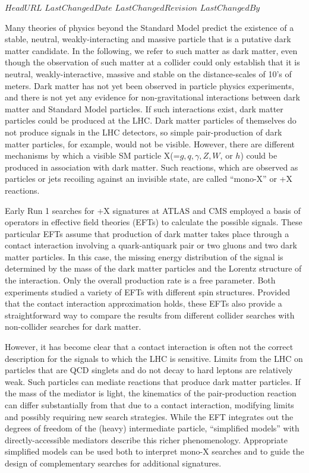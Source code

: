 \svnidlong
{$HeadURL$}
{$LastChangedDate$}
{$LastChangedRevision$}
{$LastChangedBy$}
\pagestyle{fancy}
\fancyhead{}
\fancyhead[ol]{\svnrev;\svndate;\svnauthor}

Many theories of physics beyond the Standard Model predict the existence
of a stable, neutral, weakly-interacting and massive particle that is
a putative dark matter candidate.   In the following, we refer to such
matter as dark matter, even though the observation of such matter at a collider
could only establish that it is neutral, weakly-interactive, massive and stable
on the distance-scales of 10's of meters.
Dark matter has not yet been observed in particle physics experiments, and
there is not yet any evidence for non-gravitational interactions
between dark matter and Standard Model particles.  If such
interactions exist, dark matter particles could be produced
at the LHC. Dark matter particles of themselves do not produce signals
in the LHC
detectors, so simple pair-production of dark matter particles, for example,
would
not be visible.
However, there are different mechanisms by which a
visible SM particle X(=$g, q, \gamma, Z, W$, or $h$)
could be produced in association with dark matter.
Such reactions, which are
observed as particles or jets recoiling against an invisible state, are
called ``mono-X'' or \MET{}+X reactions.


Early Run 1 searches for \MET{}+X signatures at ATLAS and CMS employed
a basis of operators in 
effective field theories (EFTs) \cite{Goodman:2010ku} to
calculate the possible signals.
These particular EFTs assume that production of dark matter takes place through
a contact interaction involving a quark-antiquark pair or two gluons and
two dark matter particles.  In this case,
the missing
energy distribution of the signal is determined
by the mass of the dark
matter particles and the Lorentz structure of the interaction. Only the
overall production rate is a free parameter. Both experiments studied a variety
of EFTs with different spin structures. Provided that the contact
interaction approximation holds, these EFTs also provide a
straightforward way to compare the results from different collider
searches with non-collider searches for dark matter.

However, it has become clear \cite{Bai:2010hh,Kopp:2011eu,Fox:2011fx,Fox:2011pm,Busoni:2013lha} that a contact
interaction is often not the correct description for the signals to
which the LHC is sensitive.
Limits from the LHC on particles that are
QCD singlets and do not decay to hard leptons are relatively
weak. Such particles can mediate reactions that produce dark matter
particles. If the mass of the mediator is light, the kinematics of the
pair-production reaction can differ substantially from that due to a contact
interaction, modifying limits and possibly requiring new search strategies.
While the EFT integrates
out the degrees of freedom of the (heavy) intermediate particle,
``simplified models'' \cite{Alwall:2008ag,Alves:2011wf} with
directly-accessible mediators describe this richer
phenomenology. Appropriate simplified models can be used both to
interpret mono-X searches and to guide the design of complementary
searches for additional signatures.

